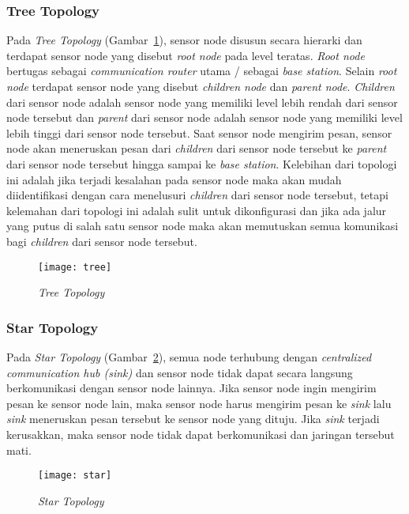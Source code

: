 \subsubsection{Tree Topology}
\label{subsubsec:treeTop}
Pada {\it Tree Topology} (Gambar~\ref{fig:tree}), sensor node disusun secara hierarki dan terdapat sensor node yang disebut {\it root node} pada level teratas. {\it Root node} bertugas sebagai {\it communication router} utama / sebagai {\it base station}. Selain {\it root node} terdapat sensor node yang disebut {\it children node} dan {\it parent node}. {\it Children} dari sensor node adalah sensor node yang memiliki level lebih rendah dari sensor node tersebut dan {\it parent} dari sensor node adalah sensor node yang memiliki level lebih tinggi dari sensor node tersebut.  Saat sensor node mengirim pesan, sensor node akan meneruskan pesan dari {\it children} dari sensor node tersebut  ke {\it parent} dari sensor node tersebut hingga sampai ke {\it base station}.  Kelebihan dari topologi ini adalah jika terjadi kesalahan pada sensor node maka akan mudah diidentifikasi dengan cara menelusuri {\it children} dari sensor node tersebut, tetapi kelemahan dari topologi ini adalah sulit untuk dikonfigurasi dan jika ada jalur yang putus di salah satu sensor node maka akan memutuskan semua komunikasi bagi {\it children} dari sensor node tersebut.
\begin{figure} [H]
	\centering  
	\texttt{[image: tree]}  
	\caption[{\it Tree Topology}]{{\it Tree Topology}} 
	\label{fig:tree} 
\end{figure} 

\subsubsection{Star Topology}
\label{subsubsec:starTop}
Pada {\it Star Topology} (Gambar~\ref{fig:star}), semua node terhubung dengan {\it centralized communication hub (sink)} dan sensor node tidak dapat secara langsung berkomunikasi dengan sensor node lainnya. Jika sensor node ingin mengirim pesan ke sensor node lain, maka sensor node harus mengirim pesan ke {\it sink} lalu {\it sink} meneruskan pesan tersebut ke sensor node yang dituju. Jika {\it sink} terjadi kerusakkan, maka sensor node tidak dapat berkomunikasi dan jaringan tersebut mati.
\begin{figure} [H]
	\centering  
	\texttt{[image: star]}  
	\caption[{\it Star Topology}]{{\it Star Topology}} 
	\label{fig:star} 
\end{figure} 


